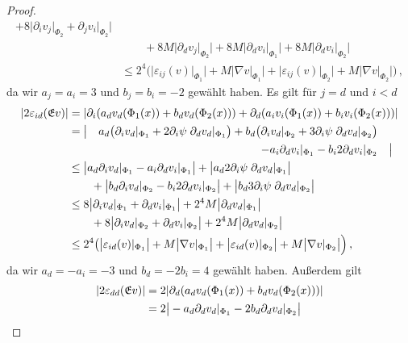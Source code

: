 \documentclass{scrartcl}
\def\e{\varepsilon}
\newcommand{\erw}{\mathfrak{E}}			%
\DeclarePairedDelimiter{\abs}{\lvert}{\rvert}
\begin{document}
\begin{proof}
\begin{align*}
		+8\big|\partial_iv_j\vert_{\Phi_2}+\partial_jv_i\vert_{\Phi_2}\big| \\
		&\qquad+8M\big|\partial_dv_j\vert_{\Phi_2}\big|
		+8M\big|\partial_dv_i\vert_{\Phi_1}\big|
		+8M\big|\partial_dv_i\vert_{\Phi_2}\big| \\
		&\leq 2^4\Big(\big|\e_{ij}(v)\vert_{\Phi_1}\big|
		+M\big|\nabla v\vert_{\Phi_1}\big|
		+\big|\e_{ij}(v)\vert_{\Phi_2}\big|
		+M\big|\nabla v\vert_{\Phi_2}\big|\Big)\,,
	\end{align*}
	da wir $a_j=a_i=3$ und $b_j=b_i=-2$ gewählt haben. Es gilt für $j=d$ und $i<d$
	\begin{align*}
		\abs{2\e_{id}(\erw v)}
		&= \abs{\partial_i(a_dv_d(\Phi_1(x))+b_dv_d(\Phi_2(x)))+\partial_d(a_iv_i(\Phi_1(x))+b_iv_i(\Phi_2(x)))} \\
		&\begin{aligned}
		&=\big| & a_d\big(\partial_iv_d\vert_{\Phi_1}
		+2\partial_i\psi\;\partial_dv_d\vert_{\Phi_1}\big)
		+b_d\big(\partial_iv_d\vert_{\Phi_2}
		+3\partial_i\psi\;\partial_dv_d\vert_{\Phi_2}\big) & \\
		&&-a_i\partial_dv_i\vert_{\Phi_1}-b_i2\partial_dv_i\vert_{\Phi_2} 
		&&\big|
		\end{aligned} \\
		&\leq\big|a_d\partial_iv_d\vert_{\Phi_1}-a_i\partial_dv_i\vert_{\Phi_1}\big|
		+\big| a_d2\partial_i\psi\;\partial_dv_d\vert_{\Phi_1}\big| \\
		& \qquad+\big|b_d\partial_iv_d\vert_{\Phi_2}-b_i2\partial_dv_i\vert_{\Phi_2}\big|
		+\big|b_d3\partial_i\psi\;\partial_dv_d\vert_{\Phi_2}\big| \\
		&\leq 8\big|\partial_iv_d\vert_{\Phi_1}+\partial_dv_i\vert_{\Phi_1}\big|+2^4M\big|\partial_dv_d\vert_{\Phi_1}\big| \\
		&\qquad+8\big|\partial_iv_d\vert_{\Phi_2}+\partial_dv_i\vert_{\Phi_2}\big|
		+2^4M\big|\partial_dv_d\vert_{\Phi_2}\big| \\
		&\leq 2^4\big(\big\lvert\e_{id}(v)\vert_{\Phi_1}\big\rvert
		+M\big\lvert\nabla v\vert_{\Phi_1}\big\rvert+\big\lvert\e_{id}(v)\vert_{\Phi_2}\big\rvert
		+M\big\lvert\nabla v\vert_{\Phi_2}\big\rvert\Big)\,,
	\end{align*}
	da wir $a_d=-a_i=-3$ und $b_d=-2b_i=4$ gewählt haben. Außerdem gilt
	\begin{align*}
		\abs{2\e_{dd}(\erw v)}
		&= 2\abs{\partial_d(a_dv_d(\Phi_1(x))+b_dv_d(\Phi_2(x)))} \\
		&= 2\big\lvert-a_d\partial_dv_d\vert_{\Phi_1} -2b_d\partial_dv_d\vert_{\Phi_2}\big\rvert \\

\end{align*}
\end{proof}
\end{document}
